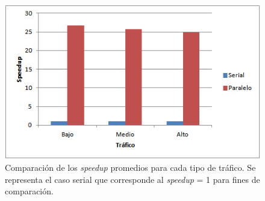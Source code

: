\begin{figure}[H]
	\centering
	\includegraphics[width=0.8\linewidth]{Figures/speedup1}
	\caption[Comparación de los \emph{speedup} promedios para cada tipo de tráfico.]{Comparación de los \emph{speedup} promedios para cada tipo de tráfico. Se representa el caso serial que corresponde al \emph{speedup} = 1 para fines de comparación.}
	\label{fig:speedup1}
\end{figure}
